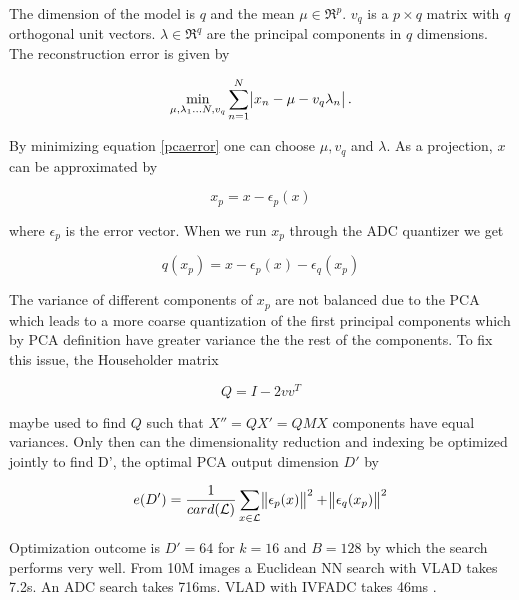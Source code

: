 \documentclass[english,12pt,a4paper,pdftex,elec,utf8]{aaltothesis}
\begin{document}
The dimension of the model is $q$ and the mean $\mu \in \Re^p$. $v_q$ is a $p \times q$ matrix with $q$ orthogonal unit vectors. $\lambda \in \Re^q$ are the principal components in $q$ dimensions. The reconstruction error is given by

\begin{equation}\label{pcaerror}
\min_{\mu,\lambda_1\ldots N, v_q}\sum_{n=1}^N \abs{x_n-\mu - v_q\lambda_n}.
\end{equation}

By minimizing equation \ref{pcaerror} one can choose $\mu, v_q$ and $\lambda$. \cite{Blei2008} As a projection, $x$ can be approximated by

\begin{equation}\label{vladpca}
x_p = x -\epsilon_p(x)
\end{equation}

where $\epsilon_p$ is the error vector. \cite{Jegou2014} When we run $x_p$ through the ADC quantizer we get

\begin{equation}\label{vladpcaquant}
  q(x_p) = x - \epsilon_p(x) - \epsilon_q(x_p)
\end{equation}

The variance of different components of $x_p$ are not balanced due to the PCA \cite{Jegou2014} which leads to a more coarse quantization of the first principal components which by PCA definition have greater variance the the rest of the components. To fix this issue, the Householder matrix

\begin{equation}\label{householder}
Q = I - 2vv^T
\end{equation}

maybe used to find $Q$ such that $X'' = QX' = QMX$ components have equal variances.\cite{Jegou2014} Only then can the dimensionality reduction and indexing be optimized jointly to find D', the optimal PCA output dimension $D'$ by

\begin{equation}\label{jointoptimization}
e(D') = \frac{1}{card(\mathcal{L})}\sum_{x\in \mathcal{L}}\norm{\epsilon_p(x)}^2 + \norm{\epsilon_q(x_p)}^2
\end{equation}

Optimization outcome is $D'=64$ for $k=16$ and $B=128$ by which the search performs very well. From 10M images a Euclidean NN search with VLAD takes 7.2s. An ADC search takes 716ms. VLAD with IVFADC takes 46ms \cite{Jegou2014}.
\end{document}

